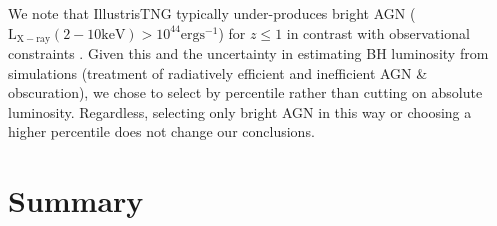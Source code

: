 \documentclass[fleqn,usenatbib]{mnras}
\begin{document}
We note that IllustrisTNG typically under-produces bright AGN ($\mathrm{L_{X-ray}(2-10 keV) > 10^{44}ergs^{-1}}$) for $z \leq 1$ in contrast with observational constraints \citep[see][]{habouzit2019}. Given this and the uncertainty in estimating BH luminosity from simulations (treatment of radiatively efficient and inefficient AGN \& obscuration), we chose to select by percentile rather than cutting on absolute luminosity. Regardless, selecting only bright AGN in this way or choosing a higher percentile does not change our conclusions.

\vspace{-1.8em}
\section{Summary} \label{sec:conclusion}
\end{document}
